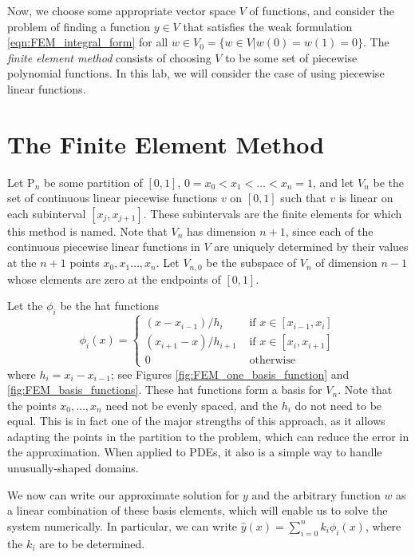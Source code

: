 Now, we choose some appropriate vector space \(V\) of functions, and consider the problem of finding a function $y\in V$ that satisfies the weak formulation \eqref{eqn:FEM_integral_form} for all $w\in V_0 = \{w \in V|w(0) = w(1) = 0\}$.
The \textit{finite element method} consists of choosing \(V\) to be some set of piecewise polynomial functions.
In this lab, we will consider the case of using piecewise linear functions.

\section*{The Finite Element Method}

Let $\mathrm{P}_n$ be some partition of $[0,1]$, $0 = x_0 < x_1< \ldots < x_{n} = 1$, and let $V_n$ be the set of continuous linear piecewise functions $v$ on $[0,1]$ such that $v$ is linear on each subinterval $[x_j,x_{j+1}]$.
These subintervals are the finite elements for which this method is named.
Note that $V_n$ has dimension $n+1$, since each of the continuous piecewise linear functions in $V$ are uniquely determined by their values at the \(n+1\) points \(x_0,x_1\ldots,x_n\).
Let $V_{n,0}$ be the subspace of $V_n$ of dimension $n-1$ whose elements are zero at the endpoints of $[0,1]$.

Let the $\phi_i$ be the hat functions
\[\phi_i(x) = \begin{cases}
(x - x_{i-1})/h_i &\text{ if } x \in [x_{i-1},x_i]\\
 (x_{i+1} - x)/h_{i+1}  &\text{ if } x \in [x_{i},x_{i+1}]\\
0 &\text{ otherwise}
\end{cases}\]
where $h_i = x_i - x_{i-1}$; see Figures \ref{fig:FEM_one_basis_function} and \ref{fig:FEM_basis_functions}.
These hat functions form a basis for $V_n$.
Note that the points \(x_0,\ldots,x_n\) need not be evenly spaced, and the \(h_i\) do not need to be equal.
This is in fact one of the major strengths of this approach, as it allows adapting the points in the partition to the problem, which can reduce the error in the approximation.
When applied to PDEs, it also is a simple way to handle unusually-shaped domains.

We now can write our approximate solution for \(y\) and the arbitrary function \(w\) as a linear combination of these basis elements, which will enable us to solve the system numerically.
In particular, we can write \(\hat{y}(x)=\sum_{i=0}^n k_i \phi_i(x)\), where the \(k_i\) are to be determined.

